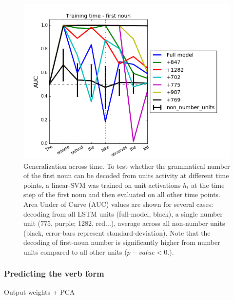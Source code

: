 \begin{figure}
\centering
\includegraphics[width=\linewidth]{Figures/Figure3_number_units_GAT.png}
\caption{Generalization across time. To test whether the grammatical number of the first noun can be decoded from units activity at different time points, a linear-SVM was trained on unit activations $h_t$ at the time step of the first noun and then evaluated on all other time points. Area Under of Curve (AUC) values are shown for several cases: decoding from all LSTM units (full-model, black), a single number unit (775, purple; 1282, red...), average across all non-number units (black, error-bars represent standard-deviation). Note that the decoding of first-noun number is significantly higher from number units compared to all other units ($p-value<0.$).}
\end{figure}

\lipsum[1]

\subsubsection{Predicting the verb form}
Output weights + PCA
\lipsum[1]

